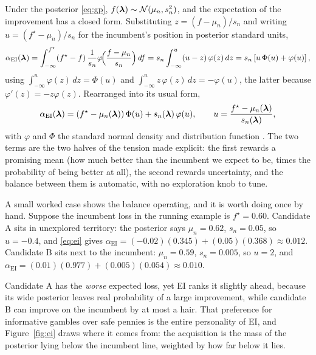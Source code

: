 Under the posterior \eqref{eq:gp},
$f(\bm{\lambda}) \sim \mathcal{N}(\mu_n, s_n^2)$, and the expectation of the improvement
has a closed form. Substituting $z = (f - \mu_n)/s_n$ and writing
$u = (f^{\star} - \mu_n)/s_n$ for the incumbent's position in posterior
standard units,
\begin{equation}
\alpha_{\mathrm{EI}}(\bm{\lambda})
= \int_{-\infty}^{f^{\star}} (f^{\star} - f)\,
  \frac{1}{s_n}\varphi\!\Big(\frac{f-\mu_n}{s_n}\Big)\, df
= s_n \int_{-\infty}^{u} (u - z)\, \varphi(z)\, dz
= s_n \left[ u\,\Phi(u) + \varphi(u) \right],
\label{eq:ei-derive}
\end{equation}
using $\int_{-\infty}^{u} \varphi(z)\,dz = \Phi(u)$ and
$\int_{-\infty}^{u} z\,\varphi(z)\,dz = -\varphi(u)$, the latter because
$\varphi'(z) = -z\varphi(z)$. Rearranged into its usual form,
\begin{equation}
\alpha_{\mathrm{EI}}(\bm{\lambda})
= \left( f^{\star} - \mu_n(\bm{\lambda}) \right) \Phi(u)
  + s_n(\bm{\lambda})\, \varphi(u),
\qquad
u = \frac{f^{\star} - \mu_n(\bm{\lambda})}{s_n(\bm{\lambda})},
\label{eq:ei}
\end{equation}
with $\varphi$ and $\Phi$ the standard normal density and distribution
function \citep{jones1998efficient}. The two terms are the two halves of
the tension made explicit: the first rewards a promising mean (how much
better than the incumbent we expect to be, times the probability of being
better at all), the second rewards uncertainty, and the balance between
them is automatic, with no exploration knob to tune.

A small worked case shows the balance operating, and it is worth doing
once by hand. Suppose the incumbent loss in the running example is
$f^{\star} = 0.60$. Candidate A sits in unexplored territory: the
posterior says $\mu_n = 0.62$, $s_n = 0.05$, so $u = -0.4$, and
\eqref{eq:ei} gives
$\alpha_{\mathrm{EI}} = (-0.02)(0.345) + (0.05)(0.368) \approx 0.012$.
Candidate B sits next to the incumbent: $\mu_n = 0.59$, $s_n = 0.005$, so
$u = 2$, and
$\alpha_{\mathrm{EI}} = (0.01)(0.977) + (0.005)(0.054) \approx 0.010$.

Candidate A has the \emph{worse} expected loss, yet EI ranks it slightly
ahead, because its wide posterior leaves real probability of a large
improvement, while candidate B can improve on the incumbent by at most a
hair. That preference for informative gambles over safe pennies is the
entire personality of EI, and Figure~\ref{fig:ei} draws where it comes
from: the acquisition is the mass of the posterior lying below the
incumbent line, weighted by how far below it lies.

